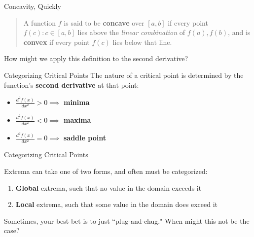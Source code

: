 \documentclass[10pt]{beamer}
\begin{document}
\begin{frame}{Concavity, Quickly}
    
    \begin{quote}
        A function $f$ is said to be \textbf{concave} over $[a,b]$ if every point $f(c) : c \in [a,b]$ lies above the \textit{linear combination} of $f(a),f(b)$, and is \textbf{convex} if every point $f(c)$ lies below that line.
    \end{quote}

    \vspace{1cm}

    How might we apply this definition to the second derivative?
    
\end{frame}

\begin{frame}{Categorizing Critical Points}
    The nature of a critical point is determined by the function's \textbf{second derivative} at that point:

    \begin{itemize}
        \item $\frac{d^2f(x)}{dx^2} > 0 \implies $ \textbf{minima}
        \item $\frac{d^2f(x)}{dx^2} < 0 \implies $ \textbf{maxima}
        \item $\frac{d^2f(x)}{dx^2} = 0 \implies $ \textbf{saddle point}
    \end{itemize}
\end{frame}



\begin{frame}{Categorizing Critical Points}

Extrema can take one of two forms, and often must be categorized: \\

\vspace{.5cm}

\begin{enumerate}
    \item \textbf{Global} extrema, such that no value in the domain exceeds it
    \item \textbf{Local} extrema, such that some value in the domain does exceed it
\end{enumerate}
\vspace{1cm}
Sometimes, your best bet is to just ``plug-and-chug." \textcolor{NavyBlue}{When might this not be the case?}
    
\end{frame}
\end{document}
